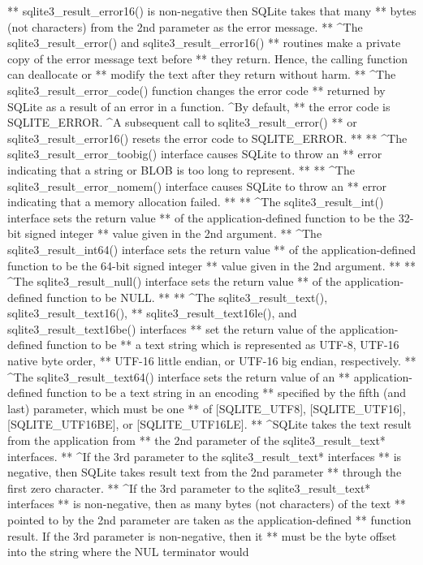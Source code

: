 \begin{Codex}[label=sqlite3.h,numbers=left]
{** sqlite3_result_error16() is non-negative then SQLite takes that many
** bytes (not characters) from the 2nd parameter as the error message.
** ^The sqlite3_result_error() and sqlite3_result_error16()
** routines make a private copy of the error message text before
** they return.  Hence, the calling function can deallocate or
** modify the text after they return without harm.
** ^The sqlite3_result_error_code() function changes the error code
** returned by SQLite as a result of an error in a function.  ^By default,
** the error code is SQLITE_ERROR.  ^A subsequent call to sqlite3_result_error()
** or sqlite3_result_error16() resets the error code to SQLITE_ERROR.
**
** ^The sqlite3_result_error_toobig() interface causes SQLite to throw an
** error indicating that a string or BLOB is too long to represent.
**
** ^The sqlite3_result_error_nomem() interface causes SQLite to throw an
** error indicating that a memory allocation failed.
**
** ^The sqlite3_result_int() interface sets the return value
** of the application-defined function to be the 32-bit signed integer
** value given in the 2nd argument.
** ^The sqlite3_result_int64() interface sets the return value
** of the application-defined function to be the 64-bit signed integer
** value given in the 2nd argument.
**
** ^The sqlite3_result_null() interface sets the return value
** of the application-defined function to be NULL.
**
** ^The sqlite3_result_text(), sqlite3_result_text16(),
** sqlite3_result_text16le(), and sqlite3_result_text16be() interfaces
** set the return value of the application-defined function to be
** a text string which is represented as UTF-8, UTF-16 native byte order,
** UTF-16 little endian, or UTF-16 big endian, respectively.
** ^The sqlite3_result_text64() interface sets the return value of an
** application-defined function to be a text string in an encoding
** specified by the fifth (and last) parameter, which must be one
** of [SQLITE_UTF8], [SQLITE_UTF16], [SQLITE_UTF16BE], or [SQLITE_UTF16LE].
** ^SQLite takes the text result from the application from
** the 2nd parameter of the sqlite3_result_text* interfaces.
** ^If the 3rd parameter to the sqlite3_result_text* interfaces
** is negative, then SQLite takes result text from the 2nd parameter
** through the first zero character.
** ^If the 3rd parameter to the sqlite3_result_text* interfaces
** is non-negative, then as many bytes (not characters) of the text
** pointed to by the 2nd parameter are taken as the application-defined
** function result.  If the 3rd parameter is non-negative, then it
** must be the byte offset into the string where the NUL terminator would
}
\end{Codex}
